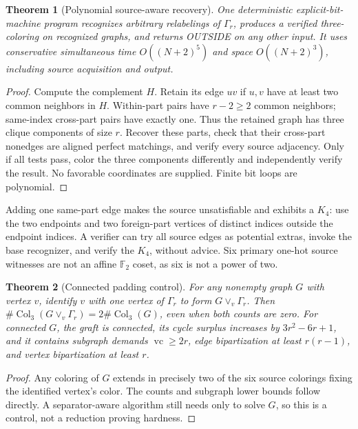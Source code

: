 \documentclass{article}
\newtheorem{theorem}{Theorem}
\begin{document}
\begin{theorem}[Polynomial source-aware recovery]
One deterministic explicit-bit-machine program recognizes arbitrary relabelings of $\Gamma_r$, produces a verified three-coloring on recognized graphs, and returns OUTSIDE on any other input. It uses conservative simultaneous time $O((N+2)^5)$ and space $O((N+2)^3)$, including source acquisition and output.
\end{theorem}
\begin{proof}
Compute the complement $H$. Retain its edge $uv$ if $u,v$ have at least two common neighbors in $H$. Within-part pairs have $r-2\ge2$ common neighbors; same-index cross-part pairs have exactly one. Thus the retained graph has three clique components of size $r$. Recover these parts, check that their cross-part nonedges are aligned perfect matchings, and verify every source adjacency. Only if all tests pass, color the three components differently and independently verify the result. No favorable coordinates are supplied. Finite bit loops are polynomial.
\end{proof}
Adding one same-part edge makes the source unsatisfiable and exhibits a $K_4$: use the two endpoints and two foreign-part vertices of distinct indices outside the endpoint indices. A verifier can try all source edges as potential extras, invoke the base recognizer, and verify the $K_4$, without advice. Six primary one-hot source witnesses are not an affine $\mathbb F_2$ coset, as six is not a power of two.

\begin{theorem}[Connected padding control]
For any nonempty graph $G$ with vertex $v$, identify $v$ with one vertex of $\Gamma_r$ to form $G\vee_v\Gamma_r$. Then $\#\operatorname{Col}_3(G\vee_v\Gamma_r)=2\#\operatorname{Col}_3(G)$, even when both counts are zero. For connected $G$, the graft is connected, its cycle surplus increases by $3r^2-6r+1$, and it contains subgraph demands $\operatorname{vc}\ge2r$, edge bipartization at least $r(r-1)$, and vertex bipartization at least $r$.
\end{theorem}
\begin{proof}
Any coloring of $G$ extends in precisely two of the six source colorings fixing the identified vertex's color. The counts and subgraph lower bounds follow directly. A separator-aware algorithm still needs only to solve $G$, so this is a control, not a reduction proving hardness.
\end{proof}
\end{document}
